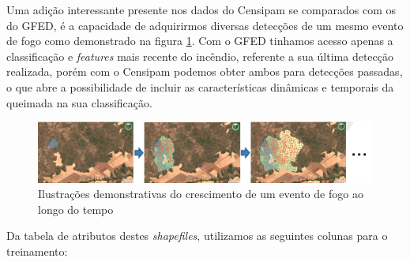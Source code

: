 Uma adição interessante presente nos dados do Censipam se comparados com os do GFED, é a capacidade de adquirirmos diversas detecções de um mesmo evento de fogo como demonstrado na figura \ref{fig:progressao}. Com o GFED tinhamos acesso apenas a classificação e \textit{features} mais recente do incêndio, referente a sua última detecção realizada, porém com o Censipam podemos obter ambos para detecções passadas, o que abre a possibilidade de incluir as características dinâmicas e temporais da queimada na sua classificação.



\begin{figure}[htb]
	\centering
	\begin{minipage}{0.9\linewidth}
		\centering
		\includegraphics[width=\linewidth]{tg1/figuras/progressao_queimada.png}
		\caption{Ilustrações demonstrativas do crescimento de um evento de fogo ao longo do tempo} \label{fig:progressao}
	\end{minipage}
\end{figure}

Da tabela de atributos destes \textit{shapefiles}, utilizamos as seguintes colunas para o treinamento:

\newpage

